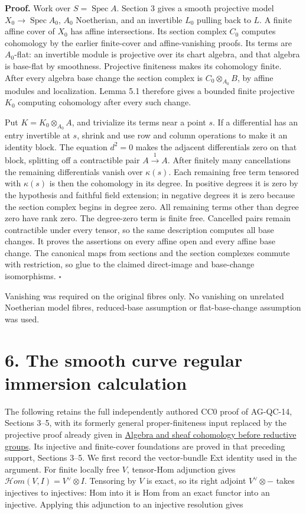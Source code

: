 \documentclass[11pt,a4paper,openany]{report}
\begin{document}
\textbf{Proof.} Work over \(S=\operatorname{Spec}A\). Section 3 gives a smooth projective model \(X_0\to\operatorname{Spec}A_0\), \(A_0\) Noetherian, and an invertible \(L_0\) pulling back to \(L\). A finite affine cover of \(X_0\) has affine intersections. Its section complex \(C_0\) computes cohomology by the earlier finite-cover and affine-vanishing proofs. Its terms are \(A_0\)-flat: an invertible module is projective over its chart algebra, and that algebra is base-flat by smoothness. Projective finiteness makes its cohomology finite. After every algebra base change the section complex is \(C_0\otimes_{A_0}B\), by affine modules and localization. Lemma 5.1 therefore gives a bounded finite projective \(K_0\) computing cohomology after every such change.

Put \(K=K_0\otimes_{A_0}A\), and trivialize its terms near a point \(s\). If a differential has an entry invertible at \(s\), shrink and use row and column operations to make it an identity block. The equation \(d^2=0\) makes the adjacent differentials zero on that block, splitting off a contractible pair \(A\xrightarrow{1}A\). After finitely many cancellations the remaining differentials vanish over \(\kappa(s)\). Each remaining free term tensored with \(\kappa(s)\) is then the cohomology in its degree. In positive degrees it is zero by the hypothesis and faithful field extension; in negative degrees it is zero because the section complex begins in degree zero. All remaining terms other than degree zero have rank zero. The degree-zero term is finite free. Cancelled pairs remain contractible under every tensor, so the same description computes all base changes. It proves the assertions on every affine open and every affine base change. The canonical maps from sections and the section complexes commute with restriction, so glue to the claimed direct-image and base-change isomorphisms. \(\square\)

Vanishing was required on the original fibres only. No vanishing on unrelated Noetherian model fibres, reduced-base assumption or flat-base-change assumption was used.

\section{6. The smooth curve regular immersion calculation}\label{AG-RG-S02-the-smooth-curve-regular-immersion-calculation}

The following retains the full independently authored CC0 proof of AG-QC-14, Sections 3--5, with its formerly general proper-finiteness input replaced by the projective proof already given in \href{https://github.com/KokunoYumeto/open-math-courses/blob/main/docs/courses/AG-RG/AG-RG-S01.md}{Algebra and sheaf cohomology before reductive groups}. Its injective and finite-cover foundations are proved in that preceding support, Sections 3--5. We first record the vector-bundle Ext identity used in the argument. For finite locally free \(V\), tensor-Hom adjunction gives \(\mathcal H om(V,I)=V^\vee\otimes I\). Tensoring by \(V\) is exact, so its right adjoint \(V^\vee\otimes-\) takes injectives to injectives: Hom into it is Hom from an exact functor into an injective. Applying this adjunction to an injective resolution gives
\end{document}
